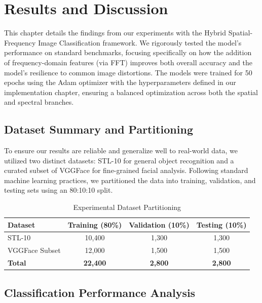 \chapter{Results and Discussion}
\label{ch:results}

This chapter details the findings from our experiments with the Hybrid Spatial-Frequency Image Classification framework. We rigorously tested the model’s performance on standard benchmarks, focusing specifically on how the addition of frequency-domain features (via FFT) improves both overall accuracy and the model's resilience to common image distortions. The models were trained for 50 epochs using the Adam optimizer \cite{Kingma} with the hyperparameters defined in our implementation chapter, ensuring a balanced optimization across both the spatial and spectral branches.

\section{Dataset Summary and Partitioning}

To ensure our results are reliable and generalize well to real-world data, we utilized two distinct datasets: STL-10 for general object recognition and a curated subset of VGGFace for fine-grained facial analysis. Following standard machine learning practices, we partitioned the data into training, validation, and testing sets using an 80:10:10 split. 

\begin{table}[h!]
    \centering
    \caption{Experimental Dataset Partitioning}
    \label{tab:dataset_stats}
    \begin{tabular}{|l|c|c|c|}
        \hline
        \textbf{Dataset} & \textbf{Training (80\%)} & \textbf{Validation (10\%)} & \textbf{Testing (10\%)} \\ \hline
        STL-10           & 10,400                   & 1,300                     & 1,300                   \\ \hline
        VGGFace Subset   & 12,000                   & 1,500                     & 1,500                   \\ \hline
        \textbf{Total}   & \textbf{22,400}          & \textbf{2,800}            & \textbf{2,800}          \\ \hline
    \end{tabular}
\end{table}

\section{Classification Performance Analysis}

